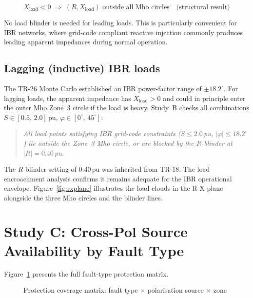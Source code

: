 \documentclass[11pt,a4paper]{article}
\begin{document}
\begin{equation}
  X_\mathrm{load} < 0 \;\Longrightarrow\; (R,X_\mathrm{load})
  \text{ outside all Mho circles} \quad\text{(structural result)}
\end{equation}

No load blinder is needed for leading loads.  This is particularly convenient for
IBR networks, where grid-code compliant reactive injection commonly produces
leading apparent impedances during normal operation.

\subsection{Lagging (inductive) IBR loads}

The TR-26 Monte Carlo established an IBR power-factor range of $\pm 18.2^\circ$.
For lagging loads, the apparent impedance has $X_\mathrm{load}>0$ and could in
principle enter the outer Mho Zone~3 circle if the load is heavy.  Study~B checks
all combinations $S\in[0.5,\,2.0]$\,pu, $\varphi\in[0^\circ,\,45^\circ]$:

\begin{quote}
  \textit{All load points satisfying IBR grid-code constraints
  ($S\leq 2.0$\,pu, $|\varphi|\leq 18.2^\circ$) lie outside the Zone~3 Mho
  circle, or are blocked by the $R$-blinder at $|R|=0.40$\,pu.}
\end{quote}

The $R$-blinder setting of $0.40$\,pu was inherited from TR-18.  The load
encroachment analysis confirms it remains adequate for the IBR operational
envelope.  Figure~\ref{fig:rxplane} illustrates the load clouds in the R-X plane
alongside the three Mho circles and the blinder lines.

\section{Study C: Cross-Pol Source Availability by Fault Type}
\label{sec:fault_type}

Figure~\ref{fig:fault_matrix} presents the full fault-type protection matrix.

\begin{figure}[h!]
\centering
\caption{Protection coverage matrix: fault type $\times$ polarisation source $\times$ zone}
\label{fig:fault_matrix}

\end{figure}
\end{document}
